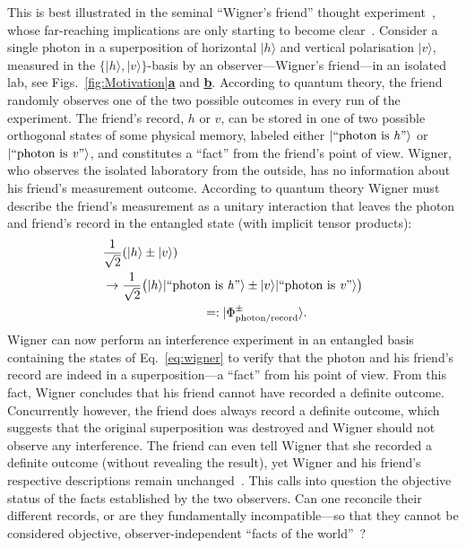 \documentclass[aps,floatfix,superscriptaddress,twocolumn,tightenlines,amsmath,amssymb,nofootinbib,10pt]{revtex4-1}
\newcommand{\ket}[1] {| #1 \rangle}
\begin{document}
This is best illustrated in the seminal ``Wigner's friend'' thought experiment~\cite{Wigner1961}, whose far-reaching implications are only starting to become clear~\cite{Brukner2015MeasurementProblem,Brukner2018,Frauchiger2016}. Consider a single photon in a superposition of horizontal $\ket{h}$ and vertical polarisation $\ket{v}$, measured in the $\{\ket{h},\ket{v}\}$-basis by an observer---Wigner's friend---in an isolated lab, see Figs.~\hyperref[fig:Motivation]{\ref*{fig:Motivation}\textbf{a}} and \hyperref[fig:Motivation]{\textbf{b}}. According to quantum theory, the friend randomly observes one of the two possible outcomes in every run of the experiment. The friend's record, $h$ or $v$, can be stored in one of two possible orthogonal states of some physical memory, labeled either $\ket{\text{``photon is \textit{h}''}}$ or $\ket{\text{``photon is \textit{v}''}}$, and constitutes a ``fact'' from the friend's point of view. Wigner, who observes the isolated laboratory from the outside, has no information about his friend's measurement outcome. According to quantum theory Wigner must describe the friend's measurement as a unitary interaction that leaves the photon and friend's record in the entangled state (with implicit tensor products):
\begin{align}
&\frac{1}{\sqrt{2}}(\ket{h}\pm\ket{v}) \nonumber \\
&\to \frac{1}{\sqrt{2}} \big(\ket{h}\ket{\text{``photon is \textit{h}''}} \pm \ket{v}\ket{\text{``photon is \textit{v}''}} \big) \nonumber\\
& \qquad \qquad \qquad \qquad =: \ket{\Phi^\pm_{\text{photon/record}}}.
\label{eq:wigner}    
\end{align}
Wigner can now perform an interference experiment in an entangled basis containing the states of Eq.~\eqref{eq:wigner} to verify that the photon and his friend's record are indeed in a superposition---a ``fact'' from his point of view. From this fact, Wigner concludes that his friend cannot have recorded a definite outcome. Concurrently however, the friend does always record a definite outcome, which suggests that the original superposition was destroyed and Wigner should not observe any interference. The friend can even tell Wigner that she recorded a definite outcome (without revealing the result), yet Wigner and his friend's respective descriptions remain unchanged~\cite{Deutsch1985}.
This calls into question the objective status of the facts established by the two observers. Can one reconcile their different records, or are they fundamentally incompatible---so that they cannot be considered objective, observer-independent ``facts of the world''~\cite{Brukner2015MeasurementProblem,Brukner2018}? 
\end{document}
